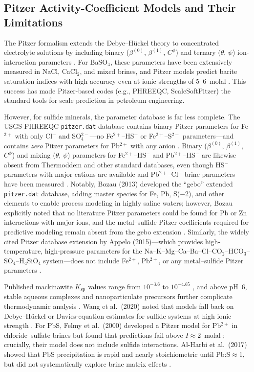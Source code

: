 \documentclass[12pt]{article}
\begin{document}
\subsection{Pitzer Activity-Coefficient Models and Their Limitations}

The Pitzer formalism extends the Debye--H\"uckel theory to concentrated electrolyte solutions by including binary ($\beta^{(0)}$, $\beta^{(1)}$, $C^\phi$) and ternary ($\theta$, $\psi$) ion-interaction parameters \cite{kan2019}. For BaSO$_4$, these parameters have been extensively measured in NaCl, CaCl$_2$, and mixed brines, and Pitzer models predict barite saturation indices with high accuracy even at ionic strengths of 5--6~molal \cite{kan2019,shaferpeltier2020}. This success has made Pitzer-based codes (e.g., PHREEQC, ScaleSoftPitzer) the standard tools for scale prediction in petroleum engineering.

However, for sulfide minerals, the parameter database is far less complete. The USGS PHREEQC \texttt{pitzer.dat} database contains binary Pitzer parameters for Fe$^{2+}$ with only Cl$^-$ and SO$_4^{2-}$---no Fe$^{2+}$--HS$^-$ or Fe$^{2+}$--S$^{2-}$ parameters---and contains \textit{zero} Pitzer parameters for Pb$^{2+}$ with any anion \cite{wang2020}. Binary ($\beta^{(0)}$, $\beta^{(1)}$, $C^\phi$) and mixing ($\theta$, $\psi$) parameters for Fe$^{2+}$--HS$^-$ and Pb$^{2+}$--HS$^-$ are likewise absent from Thermoddem and other standard databases, even though HS$^-$ parameters with major cations are available \cite{millero1986} and Pb$^{2+}$--Cl$^-$ brine parameters have been measured \cite{felmy2000}. Notably, Bozau (2013) developed the ``gebo'' extended \texttt{pitzer.dat} database, adding master species for Fe, Pb, S($-$2), and other elements to enable process modeling in highly saline waters; however, Bozau explicitly noted that no literature Pitzer parameters could be found for Pb or Zn interactions with major ions, and the metal--sulfide Pitzer coefficients required for predictive modeling remain absent from the gebo extension \cite{bozau2013}. Similarly, the widely cited Pitzer database extension by Appelo (2015)---which provides high-temperature, high-pressure parameters for the Na--K--Mg--Ca--Ba--Cl--CO$_2$--HCO$_3$--SO$_4$--H$_4$SiO$_4$ system---does not include Fe$^{2+}$, Pb$^{2+}$, or any metal--sulfide Pitzer parameters \cite{appelo2015}.

Published mackinawite $K_{\text{sp}}$ values range from $10^{-3.6}$ to $10^{-4.65}$ \cite{wylde2014,wang2020}, and above pH~6, stable aqueous complexes and nanoparticulate precursors further complicate thermodynamic analysis \cite{kan2019}. Wang et al.\ (2020) noted that models fall back on Debye--H\"uckel or Davies-equation estimates for sulfide systems at high ionic strength \cite{wang2020}. For PbS, Felmy et al.\ (2000) developed a Pitzer model for Pb$^{2+}$ in chloride--sulfate brines but found that predictions fail above $I \approx 2$~molal \cite{felmy2000}; crucially, their model does not include sulfide interactions. Al-Harbi et al.\ (2017) showed that PbS precipitation is rapid and nearly stoichiometric until Pb:S$\approx$1, but did not systematically explore brine matrix effects \cite{alharbi2017}.
\end{document}
